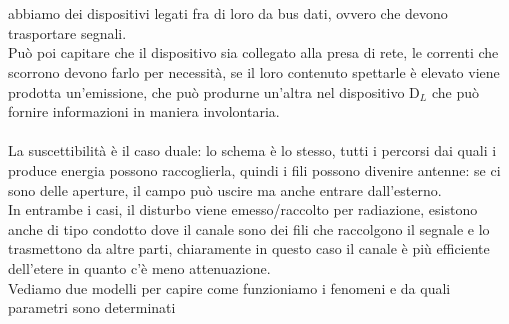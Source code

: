 \documentclass[oneside, 12pt]{extbook}
\begin{document}
\\\\abbiamo dei dispositivi legati fra di loro da bus dati, ovvero che devono trasportare segnali.\\Può poi capitare che il dispositivo sia collegato alla presa di rete, le correnti che scorrono devono farlo per necessità, se il loro contenuto spettarle è elevato viene prodotta un'emissione, che può produrne un'altra nel dispositivo D$_L$ che può fornire informazioni in maniera involontaria.\\\\La suscettibilità è il caso duale: lo schema è lo stesso, tutti i percorsi dai quali i produce energia possono raccoglierla, quindi i fili possono divenire antenne: se ci sono delle aperture, il campo può uscire ma anche entrare dall'esterno.\\In entrambe i casi, il disturbo viene emesso/raccolto per radiazione, esistono anche di tipo condotto dove il canale sono dei fili che raccolgono il segnale e lo trasmettono da altre parti, chiaramente in questo caso il canale è più efficiente dell'etere in quanto c'è meno attenuazione.\\Vediamo due modelli per capire come funzioniamo i fenomeni e da quali parametri sono determinati
\end{document}
